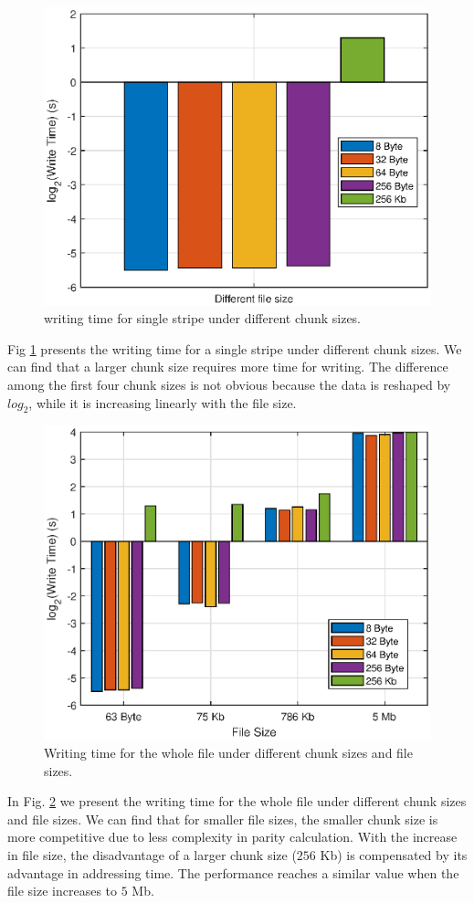 \documentclass[journal]{IEEEtran}
\begin{document}
\begin{figure}[htbp]
  \centering
  \includegraphics[width=0.9\linewidth]{Images/WriteTime_single.eps}
  \caption{writing time for single stripe under different chunk sizes.}
  \label{fig:WriteTime_single}
\end{figure}
Fig \ref{fig:WriteTime_single} presents the writing time for a single stripe under different chunk sizes. We can find that a larger chunk size requires more time for writing. The difference among the first four chunk sizes is not obvious because the data is reshaped by $log_2$, while it is increasing linearly with the file size.

\begin{figure}[htbp]
  \centering
  \includegraphics[width=0.9\linewidth]{Images/WriteTime_total.eps}
  \caption{Writing time for the whole file under different chunk sizes and file sizes.}
  \label{fig:WriteTime_total}
\end{figure}
In Fig. \ref{fig:WriteTime_total} we present the writing time for the whole file under different chunk sizes and file sizes. 
We can find that for smaller file sizes, the smaller chunk size is more competitive due to less complexity in parity calculation. 
With the increase in file size, the disadvantage of a larger chunk size ($256$ Kb) is compensated by its advantage in addressing time. The performance reaches a similar value when the file size increases to $5$ Mb. 
\end{document}
